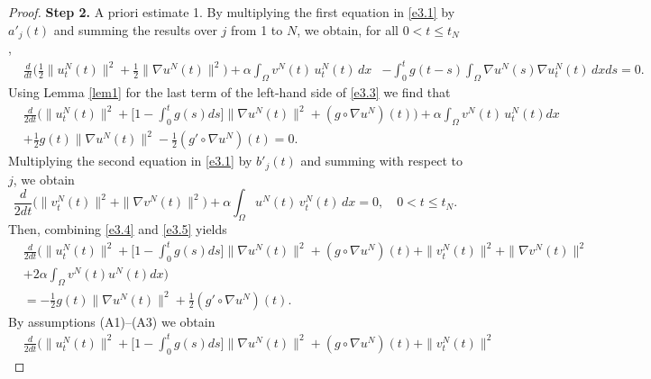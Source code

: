 \documentclass[10pt,a4paper]{amsart}
\numberwithin{equation}{section}
\begin{document}
\begin{proof}
\noindent\textbf{Step 2.} A priori estimate 1.
By multiplying the first equation in \eqref{e3.1} by \(a'_j(t)\) and summing the results over \(j\)
from 1 to \(N\), we obtain, for all \(0 < t \leq t_N\),
\begin{equation}
\begin{aligned}
&\frac{d}{dt} \Big( \frac{1}{2} \| u^N_{t}(t) \|^2 + \frac{1}{2} \| \nabla u^N(t) \|^2 \Big)
+ \alpha \int_{\Omega} v^N(t) \, u^N_{t}(t) \, dx
&- \int_0^t g(t-s) \int_{\Omega} \nabla u^N(s) \nabla u^N_{t}(t) \, dx ds =0.
\end{aligned}\label{e3.3}
\end{equation}
Using Lemma \ref{lem1} for the last term of the left-hand side of \eqref{e3.3}
we find that
\begin{equation}
\begin{aligned}
&\frac{d}{2dt} \Big( \| u^N_{t}(t) \|^2
+ \Big[ 1-\int_0^t g(s) ds \Big] \| \nabla u^N(t) \|^2 + (g\circ \nabla u^N)(t) \Big)
+\alpha \int_{\Omega} v^N(t) \, u^N_{t}(t) dx \\
& +\frac{1}{2} g(t)\parallel \nabla u^N(t) \parallel^2 - \frac{1}{2}( g'\circ\nabla u^N) (t) =0.
\end{aligned} \label{e3.4}
 \end{equation}
Multiplying the second equation in \eqref{e3.1} by $b'_j(t)$ and summing with respect to $j$, we obtain
 \begin{equation}
 \frac{d}{2 dt} \Big( \| v^N_{t}(t) \|^2 + \| \nabla v^N (t) \|^2 \Big)
 + \alpha \int_{\Omega} u^N(t) \, v^N_{t}(t) \, dx =0, \quad 0 < t \leq t_N.
 \label{e3.5}
\end{equation}
Then, combining \eqref{e3.4} and \eqref{e3.5} yields
\begin{equation}
\begin{aligned}
 &\frac{d}{2 dt} \Big( \| u^N_{t}(t) \|^2 + \Big[ 1-\int_0^t g(s)ds\Big]
 \| \nabla u^N(t) \|^2 +(g\circ\nabla u^N)(t)+\| v^N_{t}(t) \|^2 + \| \nabla v^N(t) \|^2 \\
 &+ 2 \alpha \int_{\Omega} v^N(t) u^N(t) dx\Big) \\
&=-\frac{1}{2} g(t)\parallel \nabla u^N(t) \parallel^2 + \frac{1}{2}( g'\circ\nabla u^N )(t).
\end{aligned}\label{e3.6}
\end{equation}
By assumptions (A1)--(A3) we obtain
 \begin{equation}
\begin{aligned}
&\frac{d}{2 dt} \Big( \| u^N_{t} (t) \|^2 + \Big[ 1-\int_0^t g(s)ds\Big]
 \| \nabla u^N(t) \|^2 +(g\circ\nabla u^N)(t)+\| v^N_{t}(t) \|^2

\end{aligned}
\end{equation}
\end{proof}
\end{document}
